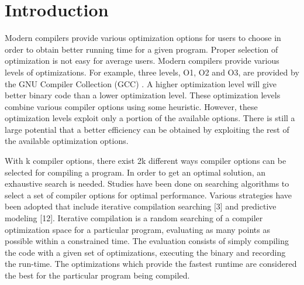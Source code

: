\documentclass[conference]{IEEEtran}
\begin{document}
\section{Introduction}
Modern compilers provide various optimization options for users to choose in order to obtain better running time for a given program. Proper selection of optimization is not easy for average users. Modern compilers provide various levels of optimizations. For example, three levels, O1, O2 and O3,
are provided by the GNU Compiler Collection (GCC) \cite{REF1}. A higher optimization level will give better binary code than a lower optimization level. These optimization levels combine various compiler options using some heuristic. However, these optimization levels exploit only a portion of the available options. There is still a large potential that a better efficiency can be obtained by exploiting the rest of the available optimization options.\par

With k compiler options, there exist 2k different ways compiler options can be selected for compiling a program. In order to get an optimal solution, an exhaustive search is needed. Studies have been done on searching algorithms to select a set of compiler options for optimal performance.
Various strategies have been adopted that include iterative compilation searching [3] and predictive modeling [12]. Iterative compilation is a random searching of a compiler optimization space for a particular program, evaluating as many points as possible within a constrained time. The evaluation consists of simply compiling the code with a given set of optimizations, executing the binary and recording the run-time. The optimizations which provide the fastest runtime are considered the best for the particular program being compiled.\par
\end{document}
